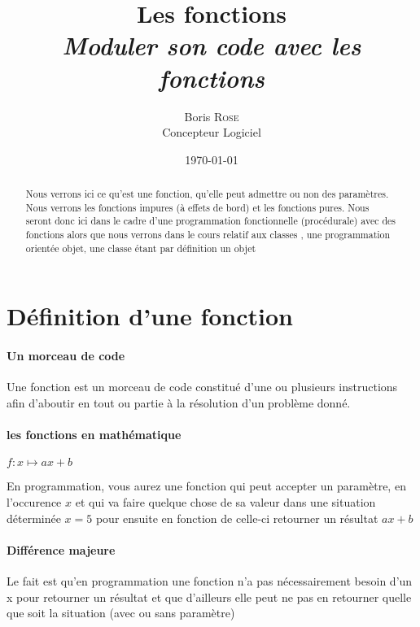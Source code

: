 \documentclass[a4paper, 12pt]{report}
\begin{document}
\everymath{\displaystyle}
\title{\textbf{Les fonctions} \\ \textit{Moduler son code avec les fonctions}}
\author{Boris \textsc{Rose} \\ Concepteur Logiciel}
\date{\today}

\newcommand{\bshow}[1]{\textcolor{cyan}{#1}}


\maketitle

\begin{abstract}
Nous verrons ici ce qu'est une fonction, qu'elle peut admettre ou non des paramètres. 
Nous verrons les fonctions impures (à effets de bord) et les fonctions pures. Nous seront donc ici dans le cadre d'une programmation fonctionnelle (procédurale) avec des fonctions alors que nous verrons dans le cours relatif aux classes , une programmation orientée objet, une classe étant par définition un objet
\end{abstract}


\section[short]{Définition d'une fonction}

\paragraph{Un morceau de code}
Une fonction est un morceau de code constitué d'une ou plusieurs instructions afin d'aboutir en tout ou partie à la résolution d'un problème donné.

\paragraph{les fonctions en mathématique}

\(f : x \mapsto ax + b\)

En programmation, vous aurez une fonction qui peut accepter un paramètre, en l'occurence $x$ et qui va faire quelque chose de sa valeur dans une situation déterminée $x = 5$ pour ensuite en fonction de celle-ci retourner un résultat $ax+b$

\paragraph{Différence majeure}
Le fait est qu'en programmation une fonction n'a pas nécessairement besoin d'un x pour retourner un résultat et que d'ailleurs elle peut ne pas en retourner quelle que soit la situation (avec ou sans paramètre)
\end{document}
